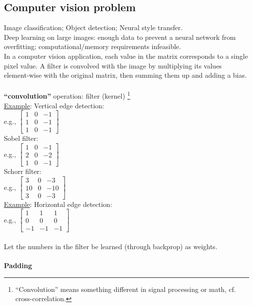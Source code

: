 \subsection{Computer vision problem}
Image classification; Object detection; Neural style transfer.\\
Deep learning on large images: enough data to prevent a neural network from overfitting; computational/memory requirements infeasible.\\
In a computer vision application, each value in the matrix corresponds to a single pixel value. A filter is convolved with the image by multiplying its values element-wise with the original matrix, then summing them up and adding a bias.\\
\\
\textbf{``convolution''} operation: filter (kernel) \footnote{``Convolution'' means something different in signal processing or math, cf. cross-correlation.}\\
\underline{Example}: Vertical edge detection:\\
e.g., $\begin{bmatrix}1 & 0 & -1 \\1 & 0 & -1 \\1 & 0 & -1 \end{bmatrix}$\\
Sobel filter:\\
e.g., $\begin{bmatrix}1 & 0 & -1 \\2 & 0 & -2 \\1 & 0 & -1 \end{bmatrix}$\\
Schorr filter:\\
e.g., $\begin{bmatrix}3 & 0 & -3 \\10 & 0 & -10 \\3 & 0 & -3 \end{bmatrix}$\\
\underline{Example}: Horizontal edge detection:\\
e.g., $\begin{bmatrix}1 & 1 & 1 \\0 & 0 & 0 \\-1 & -1 & -1 \end{bmatrix}$\\
\\
Let the numbers in the filter be learned (through backprop) as weights.\\
\\
\textbf{Padding}
